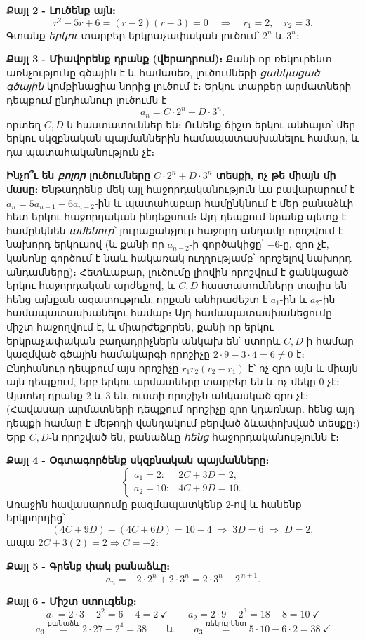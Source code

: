 \documentclass[11pt,a4paper]{article}
\begin{document}
\textbf{Քայլ 2 - Լուծենք այն։}
\[
r^2-5r+6=(r-2)(r-3)=0 \quad\Longrightarrow\quad r_1=2,\quad r_2=3.
\]
Գտանք \emph{երկու} տարբեր երկրաչափական լուծում՝ $2^n$ և $3^n$։

\textbf{Քայլ 3 - Միավորենք դրանք (վերադրում)։}
Քանի որ ռեկուրենտ առնչությունը գծային է և համասեռ, լուծումների \emph{ցանկացած գծային} կոմբինացիա
նորից լուծում է։ Երկու տարբեր արմատների դեպքում ընդհանուր լուծումն է
\[
a_n = C\cdot 2^n + D\cdot 3^n,
\]
որտեղ $C,D$-ն հաստատուններ են։ Ունենք ճիշտ երկու անհայտ՝ մեր երկու սկզբնական պայմաններին
համապատասխանելու համար, և դա պատահականություն չէ։

\textbf{Ինչո՞ւ են \emph{բոլոր} լուծումները $C\cdot2^n+D\cdot3^n$ տեսքի, ոչ թե միայն մի մասը։}
Ենթադրենք մեկ այլ հաջորդականություն ևս բավարարում է $a_n=5a_{n-1}-6a_{n-2}$-ին և պատահաբար
համընկնում է մեր բանաձևի հետ երկու հաջորդական ինդեքսում։ Այդ դեպքում նրանք պետք է համընկնեն
\emph{ամենուր}՝ յուրաքանչյուր հաջորդ անդամը որոշվում է նախորդ երկուսով (և քանի որ $a_{n-2}$-ի գործակիցը՝ $-6$-ը, զրո չէ,
կանոնը գործում է նաև հակառակ ուղղությամբ՝ որոշելով նախորդ անդամները)։ Հետևաբար, լուծումը լիովին որոշվում է ցանկացած
երկու հաջորդական արժեքով, և $C,D$ հաստատունները տալիս են հենց այնքան ազատություն, որքան անհրաժեշտ
է $a_1$-ին և $a_2$-ին համապատասխանելու համար։ Այդ համապատասխանեցումը միշտ հաջողվում է, և
միարժեքորեն, քանի որ երկու երկրաչափական բաղադրիչներն անկախ են՝ ստորև $C,D$-ի համար կազմված
գծային համակարգի որոշիչը $2\cdot 9-3\cdot 4=6\neq 0$ է։ Ընդհանուր դեպքում այս որոշիչը
$r_1 r_2(r_2-r_1)$ է՝ ոչ զրո այն և միայն այն դեպքում, երբ երկու արմատները տարբեր են և ոչ մեկը $0$ չէ։
Այստեղ դրանք $2$ և $3$ են, ուստի որոշիչն անկասկած զրո չէ։ (Հավասար արմատների դեպքում որոշիչը
զրո կդառնար. հենց այդ դեպքի համար է մեթոդի վանդակում բերված ձևափոխված տեսքը։) Երբ $C,D$-ն որոշված
են, բանաձևը \emph{հենց} հաջորդականությունն է։

\textbf{Քայլ 4 - Օգտագործենք սկզբնական պայմանները։}
\[
\begin{cases}
a_1=2: & 2C+3D=2,\\[2pt]
a_2=10: & 4C+9D=10.
\end{cases}
\]
Առաջին հավասարումը բազմապատկենք $2$-ով և հանենք երկրորդից՝
\[
(4C+9D)-(4C+6D)=10-4 \;\Longrightarrow\; 3D=6 \;\Longrightarrow\; D=2,
\]
ապա $2C+3(2)=2\Rightarrow C=-2$։

\textbf{Քայլ 5 - Գրենք փակ բանաձևը։}
\[
a_n=-2\cdot 2^n+2\cdot 3^n = 2\cdot 3^n - 2^{\,n+1}.
\]

\textbf{Քայլ 6 - Միշտ ստուգենք։}
\[
a_1=2\cdot3-2^2=6-4=2\ \checkmark\qquad
a_2=2\cdot9-2^3=18-8=10\ \checkmark
\]
\[
a_3 \stackrel{\text{բանաձև}}{=} 2\cdot27-2^4=38
\qquad\text{և}\qquad
a_3 \stackrel{\text{ռեկուրենտ}}{=} 5\cdot10-6\cdot2=38\ \checkmark
\]
\end{document}
